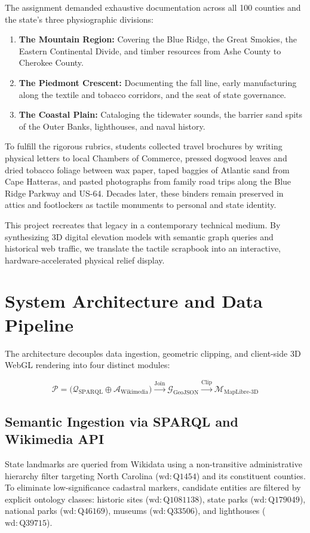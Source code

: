 \documentclass[11pt,letterpaper]{article}
\begin{document}
The assignment demanded exhaustive documentation across all 100 counties and the state's three physiographic divisions:
\begin{enumerate}
    \item \textbf{The Mountain Region:} Covering the Blue Ridge, the Great Smokies, the Eastern Continental Divide, and timber resources from Ashe County to Cherokee County.
    \item \textbf{The Piedmont Crescent:} Documenting the fall line, early manufacturing along the textile and tobacco corridors, and the seat of state governance.
    \item \textbf{The Coastal Plain:} Cataloging the tidewater sounds, the barrier sand spits of the Outer Banks, lighthouses, and naval history.
\end{enumerate}

To fulfill the rigorous rubrics, students collected travel brochures by writing physical letters to local Chambers of Commerce, pressed dogwood leaves and dried tobacco foliage between wax paper, taped baggies of Atlantic sand from Cape Hatteras, and pasted photographs from family road trips along the Blue Ridge Parkway and US-64. Decades later, these binders remain preserved in attics and footlockers as tactile monuments to personal and state identity.

This project recreates that legacy in a contemporary technical medium. By synthesizing 3D digital elevation models with semantic graph queries and historical web traffic, we translate the tactile scrapbook into an interactive, hardware-accelerated physical relief display.

\section{System Architecture and Data Pipeline}

The architecture decouples data ingestion, geometric clipping, and client-side 3D WebGL rendering into four distinct modules:

\begin{equation}
\mathcal{P} = \Big( \mathcal{Q}_{\text{SPARQL}} \oplus \mathcal{A}_{\text{Wikimedia}} \Big) \xrightarrow{\text{Join}} \mathcal{G}_{\text{GeoJSON}} \xrightarrow{\text{Clip}} \mathcal{M}_{\text{MapLibre-3D}}
\end{equation}

\subsection{Semantic Ingestion via SPARQL and Wikimedia API}
State landmarks are queried from Wikidata using a non-transitive administrative hierarchy filter targeting North Carolina ($\mathrm{wd{:}Q1454}$) and its constituent counties. To eliminate low-significance cadastral markers, candidate entities are filtered by explicit ontology classes: historic sites ($\mathrm{wd{:}Q1081138}$), state parks ($\mathrm{wd{:}Q179049}$), national parks ($\mathrm{wd{:}Q46169}$), museums ($\mathrm{wd{:}Q33506}$), and lighthouses ($\mathrm{wd{:}Q39715}$).
\end{document}

